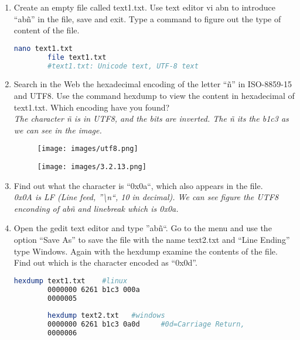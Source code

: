 \documentclass[12pt, titlepage,]{article}
\begin{document}
\begin{enumerate}
    \item Create an empty file called text1.txt. Use text editor vi abn to introduce “abñ” in the file, save and exit. Type a command to figure out the type of content of the file. 
        \begin{lstlisting}[language=Bash]
        nano text1.txt
        file text1.txt
        #text1.txt: Unicode text, UTF-8 text
        \end{lstlisting}

\clearpage
    \item Search in the Web the hexadecimal encoding of the letter “ñ” in ISO-8859-15 and UTF8. Use the command hexdump to view the content in hexadecimal of text1.txt. Which encoding have you found? \\
    \textit{\color{blue} The character ñ is in UTF8, and the bits are inverted. The ñ its the b1c3 as we can see in the image.}
    \begin{figure}[h] %
    \centering
    \texttt{[image: images/utf8.png]}
\end{figure}  





    
           
    \begin{figure}[h] %
    \centering
    \texttt{[image: images/3.2.13.png]}
\end{figure}

    

    \item Find out what the character is “0x0a“, which also appears in the file. \\
     \textit{\color{blue}0x0A is LF (Line feed, ”{\textbackslash n}“,  10 in decimal). We can see figure the UTF8 enconding of abñ and linebreak which is 0x0a. }  

    \item Open the gedit text editor and type ”abñ“. Go to the menu and use the option “Save As” to save the file with the name text2.txt and “Line Ending” type Windows. Again with the hexdump examine the contents of the file. Find out which is the character encoded as “0x0d”.
         \begin{lstlisting}[language=Bash]
        hexdump text1.txt    #linux 
        0000000 6261 b1c3 000a                         
        0000005
        
        hexdump text2.txt   #windows
        0000000 6261 b1c3 0a0d     #0d=Carriage Return,                    
        0000006
        

\end{lstlisting}
\end{enumerate}
\end{document}

